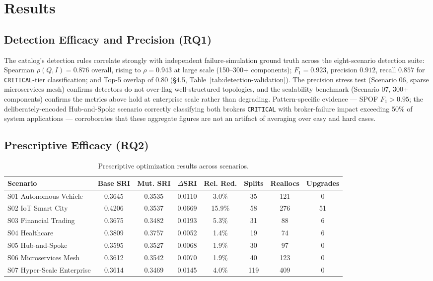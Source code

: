 \documentclass[11pt]{article}
\begin{document}
\section{Results}

\subsection{Detection Efficacy and Precision (RQ1)}

The catalog's detection rules correlate strongly with independent failure-simulation ground truth
across the eight-scenario detection suite: Spearman $\rho(Q, I) = 0.876$ overall, rising to $\rho =
0.943$ at large scale (150--300+ components); $F_1 = 0.923$, precision $0.912$, recall $0.857$ for
\texttt{CRITICAL}-tier classification; and Top-5 overlap of $0.80$ (\S4.5, Table~\ref{tab:detection-validation}).
The precision stress test (Scenario 06, sparse microservices mesh) confirms detectors do not
over-flag well-structured topologies, and the scalability benchmark (Scenario 07, 300+ components)
confirms the metrics above hold at enterprise scale rather than degrading. Pattern-specific evidence
--- SPOF $F_1 > 0.95$; the deliberately-encoded Hub-and-Spoke scenario correctly classifying both
brokers \texttt{CRITICAL} with broker-failure impact exceeding 50\% of system applications ---
corroborates that these aggregate figures are not an artifact of averaging over easy and hard cases.

\subsection{Prescriptive Efficacy (RQ2)}

\begin{table}[htbp]
\centering
\caption{Prescriptive optimization results across scenarios.}
\label{tab:prescriptive-results}
\begin{tabular}{@{}lccccccc@{}}
\toprule
Scenario & Base SRI & Mut. SRI & $\Delta$SRI & Rel. Red. & Splits & Reallocs & Upgrades \\
\midrule
S01 Autonomous Vehicle & 0.3645 & 0.3535 & 0.0110 & 3.0\% & 35 & 121 & 0 \\
S02 IoT Smart City & 0.4206 & 0.3537 & 0.0669 & 15.9\% & 58 & 276 & 51 \\
S03 Financial Trading & 0.3675 & 0.3482 & 0.0193 & 5.3\% & 31 & 88 & 6 \\
S04 Healthcare & 0.3809 & 0.3757 & 0.0052 & 1.4\% & 19 & 74 & 6 \\
S05 Hub-and-Spoke & 0.3595 & 0.3527 & 0.0068 & 1.9\% & 30 & 97 & 0 \\
S06 Microservices Mesh & 0.3612 & 0.3542 & 0.0070 & 1.9\% & 40 & 123 & 0 \\
S07 Hyper-Scale Enterprise & 0.3614 & 0.3469 & 0.0145 & 4.0\% & 119 & 409 & 0 \\
\bottomrule
\end{tabular}
\end{table}
\end{document}
